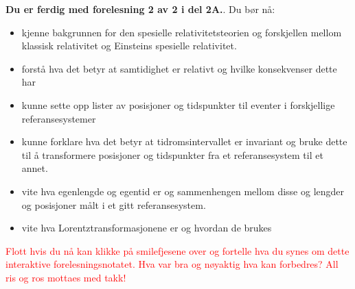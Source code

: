 \documentclass{beamer}
\let\hrefori\href
\renewcommand{\href}[2]{{\setlength{\fboxsep}{1pt}\colorbox{sunset}{\hrefori{#1}{#2}}}}
\newcommand{\pagebutton}[1]{\setbeamertemplate{button}{\tikz\node[inner xsep = 5pt, draw = structure!90, fill = green(ryb), rounded corners = 8pt]{\color{amber}\Large\insertbuttontext};}\beamerbutton{#1}}
\begin{document}
\begin{frame}
\label{oppsummering}
\hyperlink{oppsummering0}{\pagebutton{\small Forrige side}}\href{https://nettskjema.no/a/170171}{ \Changey[1][yellow]{-2}}
{\bf Du er ferdig med forelesning 2 av 2 i del 2A.}. Du bør nå:
\begin{itemize}
\item kjenne bakgrunnen for den spesielle relativitetsteorien og forskjellen mellom klassisk relativitet og Einsteins spesielle relativitet.
\item forstå hva det betyr at samtidighet er relativt og hvilke konsekvenser dette har
\item kunne sette opp lister av posisjoner og tidspunkter til eventer i forskjellige referansesystemer
\item kunne forklare hva det betyr at tidromsintervallet er invariant og bruke dette til å transformere posisjoner og tidspunkter fra et referansesystem til et annet.
\item vite hva egenlengde og egentid er og sammenhengen mellom disse og lengder og posisjoner målt i et gitt referansesystem.
\item vite hva Lorentztransformasjonene er og hvordan de brukes
\end{itemize}
\textcolor{red}{Flott hvis du nå kan klikke på smilefjesene over og fortelle hva du synes om dette interaktive forelesningsnotatet. Hva var bra og nøyaktig hva kan forbedres? All ris og ros mottaes med takk!}
\end{frame}
\end{document}
